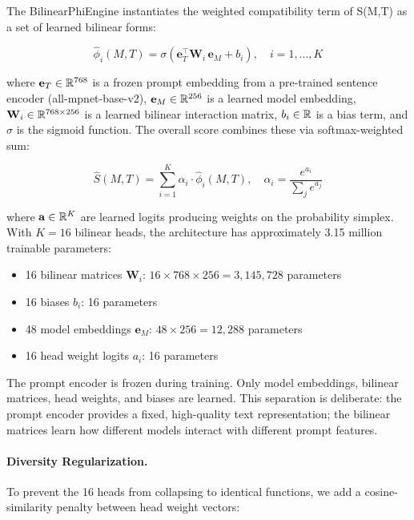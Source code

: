 The BilinearPhiEngine instantiates the weighted compatibility term of S(M,T) as a set of learned bilinear forms:

\begin{equation}
\label{eq:bilinear_phi}
\hat{\phi}_i(M, T) = \sigma\!\left(\mathbf{e}_T^\top \mathbf{W}_i \, \mathbf{e}_M + b_i\right), \quad i = 1, \ldots, K
\end{equation}

where $\mathbf{e}_T \in \mathbb{R}^{768}$ is a frozen prompt embedding from a pre-trained sentence encoder (all-mpnet-base-v2), $\mathbf{e}_M \in \mathbb{R}^{256}$ is a learned model embedding, $\mathbf{W}_i \in \mathbb{R}^{768 \times 256}$ is a learned bilinear interaction matrix, $b_i \in \mathbb{R}$ is a bias term, and $\sigma$ is the sigmoid function. The overall score combines these via softmax-weighted sum:

\begin{equation}
\label{eq:bilinear_score}
\hat{S}(M, T) = \sum_{i=1}^{K} \alpha_i \cdot \hat{\phi}_i(M, T), \quad \alpha_i = \frac{e^{a_i}}{\sum_j e^{a_j}}
\end{equation}

where $\mathbf{a} \in \mathbb{R}^K$ are learned logits producing weights on the probability simplex. With $K=16$ bilinear heads, the architecture has approximately 3.15 million trainable parameters:

\begin{itemize}
    \item 16 bilinear matrices $\mathbf{W}_i$: $16 \times 768 \times 256 = 3{,}145{,}728$ parameters
    \item 16 biases $b_i$: 16 parameters
    \item 48 model embeddings $\mathbf{e}_M$: $48 \times 256 = 12{,}288$ parameters
    \item 16 head weight logits $a_i$: 16 parameters
\end{itemize}

The prompt encoder is frozen during training. Only model embeddings, bilinear matrices, head weights, and biases are learned. This separation is deliberate: the prompt encoder provides a fixed, high-quality text representation; the bilinear matrices learn how different models interact with different prompt features.

\paragraph{Diversity Regularization.} To prevent the 16 heads from collapsing to identical functions, we add a cosine-similarity penalty between head weight vectors:

